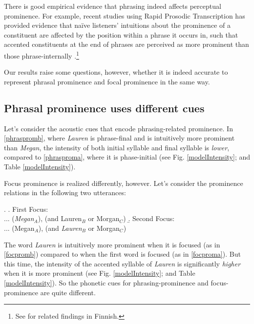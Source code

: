 \documentclass[preprint,review,12pt,authoryear,times]{elsarticle}
\begin{document}
There is good empirical evidence that phrasing indeed affects perceptual prominence. For example, recent studies using Rapid Prosodic Transcription \citep{cole10rapid} has provided evidence that na\"ive listeners' intuitions about the prominence of a constituent are affected by the position within a phrase it occurs in, such that accented constituents at the end of phrases are perceived as more prominent than those phrase-internally \citep[see also][]{bisho19,cole19}.\footnote{See \citet{vaini06} for related findings in Finnish.}  

Our results raise some questions, however, whether it is indeed accurate to represent phrasal prominence and focal prominence in the same way. 


\subsection{Phrasal prominence uses different cues}

Let's consider the acoustic cues that encode phrasing-related  prominence.  In \ref{phraspromb}, where {\em Lauren} is phrase-final and is intuitively more prominent than {\em Megan}, the intensity of both initial syllable and final syllable is {\em lower}, compared to \ref{phrasproma}, where it is phase-initial (see Fig. \ref{modelIntensity}; and Table \ref{modelIntensity}).  

Focus prominence is realized differently, however. Let's consider the prominence relations in the following two utterances:

\ex.\label{focprom}
\a. First Focus:\\
 ... ({\em Megan}$_A$), (and {Lauren}$_B$ or Morgan$_C$)\label{focproma}
\b. Second Focus:\\
... (Megan$_A$), (and {\em Lauren}$_B$ or Morgan$_C$) \label{focpromb}

The word {\em Lauren} is intuitively more prominent when it is focused (as in \ref{focpromb}) compared to when the first word is focused (as in \ref{focproma}). But this time, the intensity of the accented syllable of {\em Lauren} is significantly {\em higher} when it is more prominent (see Fig. \ref{modelIntensity}; and Table \ref{modelIntensity}). So the phonetic cues for phrasing-prominence and focus-prominence are quite different. 
\end{document}
